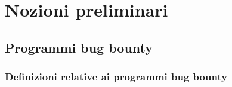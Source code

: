 %
%
%
%
%
%
%

\section{Nozioni preliminari}

%
%

\subsection{Programmi bug bounty}

\subsubsection{Definizioni relative ai programmi bug bounty}

